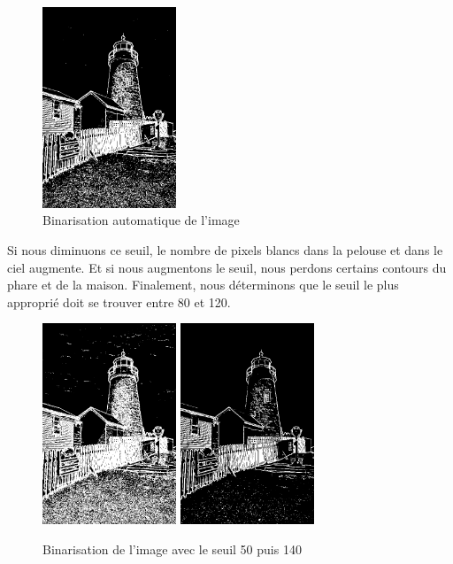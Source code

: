 \documentclass[a4paper,11pt]{article}
\begin{document}
  \begin{figure}[H]
  \center
   \includegraphics[width=4cm]{../binAuto.png}
   \caption{Binarisation automatique de l'image}
  \end{figure}
  
  Si nous diminuons ce seuil, le nombre de pixels blancs dans la pelouse et dans le ciel augmente. Et si
  nous augmentons le seuil, nous perdons certains contours du phare et de la maison. Finalement, nous déterminons que le seuil le plus 
  approprié doit se trouver entre 80 et 120.\\
  
  \begin{figure}[H]
  \center
   \includegraphics[width=4cm]{../bin50.png}
   \includegraphics[width=4cm]{../bin140.png}
   \caption{Binarisation de l'image avec le seuil 50 puis 140}
  \end{figure}
  
\end{document}
